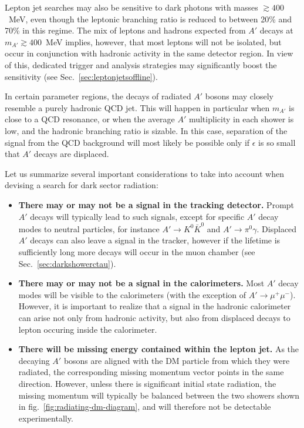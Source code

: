 \begin{enumerate}
Lepton jet searches may also be sensitive to dark photons
with masses $\gtrsim 400$~MeV, even though the leptonic branching ratio is reduced
to between 20\% and 70\% in this regime. The mix of leptons and hadrons
expected from $A'$ decays at $m_{A'} \gtrsim 400$~MeV implies, however,
that most leptons will not be isolated, but occur in conjunction with hadronic
activity in the same detector region.  In view of this, dedicated trigger and
analysis strategies may significantly boost the sensitivity (see Sec.~\ref{sec:leptonjetsoffline}).

In certain parameter regions, the decays of radiated $A'$ bosons may closely
resemble a purely hadronic QCD jet. This will happen in particular when $m_{A'}$
is close to a QCD resonance, or when the average $A'$ multiplicity in each
shower is low, and the hadronic branching ratio is sizable. In this case,
separation of the signal from the QCD background will most likely be possible
only if $\epsilon$ is so small that $A'$ decays are displaced.

Let us summarize several important considerations to take into account when
devising a search for dark sector radiation:
\begin{itemize}
  \item {\bf There may or may not be a signal in the tracking detector.}
    Prompt $A'$ decays will typically lead to such signals, except for specific
    $A'$ decay modes to neutral particles, for instance $A' \to K^0 \bar{K}^0$
    and $A' \to \pi^0 \gamma$. Displaced $A'$ decays can also leave a signal in the tracker,
    however if the lifetime is sufficiently long more decays will occur in the muon chamber (see Sec.~\ref{sec:darkshowerctau}).

  \item {\bf There may or may not be a signal in the calorimeters.} Most $A'$
    decay modes will be visible to the calorimeters (with the exception of $A'
    \to \mu^+ \mu^-$). However, it is important to realize that a signal in the
    hadronic calorimeter can arise not only from hadronic activity, but also
    from displaced decays to lepton occuring inside the calorimeter.

  \item {\bf There will be missing energy contained within the lepton jet.}
    As the decaying $A'$ bosons are aligned with the DM particle from which
    they were radiated, the corresponding missing momentum vector points in
    the same direction. However, unless there is significant initial
    state radiation, the missing momentum will typically be balanced between
    the two showers shown in fig.~\ref{fig:radiating-dm-diagram}, and
    will therefore not be detectable experimentally.
\end{itemize}


\end{enumerate}
